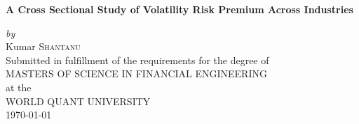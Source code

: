 \begin{titlepage}


\center 




{ \huge \bfseries A Cross Sectional Study of Volatility Risk Premium Across Industries}\\[1cm] 
 
\begin{center} 
    \large
    \doublespacing  %
    \emph{by}\\
    Kumar \textsc{Shantanu}  \\[1cm]  %
    
    Submitted in fulfillment of the requirements for the degree of\\
    MASTERS OF SCIENCE IN FINANCIAL ENGINEERING\\ 
    at the\\
    WORLD QUANT UNIVERSITY\\[1cm]  %
    \today
    \end{center}


\end{titlepage}

